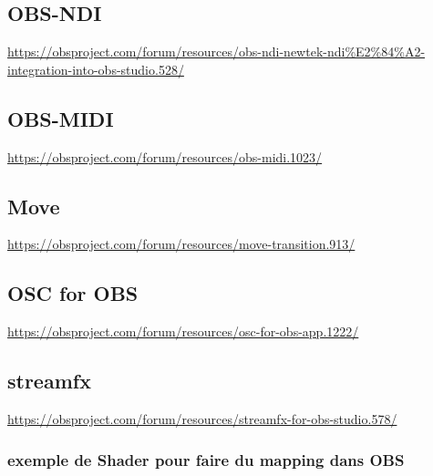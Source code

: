 \documentclass[
  french,
]{book}
\begin{document}
\hypertarget{obs-ndi}{%
\subsection{OBS-NDI}\label{obs-ndi}}

\url{https://obsproject.com/forum/resources/obs-ndi-newtek-ndi\%E2\%84\%A2-integration-into-obs-studio.528/}

\hypertarget{obs-midi}{%
\subsection{OBS-MIDI}\label{obs-midi}}

\url{https://obsproject.com/forum/resources/obs-midi.1023/}

\hypertarget{move}{%
\subsection{Move}\label{move}}

\url{https://obsproject.com/forum/resources/move-transition.913/}

\hypertarget{osc-for-obs}{%
\subsection{OSC for OBS}\label{osc-for-obs}}

\url{https://obsproject.com/forum/resources/osc-for-obs-app.1222/}

\hypertarget{streamfx}{%
\subsection{streamfx}\label{streamfx}}

\url{https://obsproject.com/forum/resources/streamfx-for-obs-studio.578/}

\hypertarget{exemple-de-shader-pour-faire-du-mapping-dans-obs}{%
\subsubsection{exemple de Shader pour faire du mapping dans OBS}\label{exemple-de-shader-pour-faire-du-mapping-dans-obs}}
\end{document}
